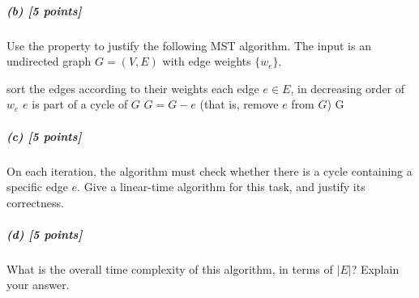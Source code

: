 \documentclass[11pt]{article}
\begin{document}


\subparagraph{(b) [5 points]}
Use the property to justify the following MST algorithm. The input is an undirected graph
$G = (V, E)$ with edge weights $\{ w_e \}$.

\begin{codebox}
\li sort the edges according to their weights
\li \For each edge $e \in E$, in decreasing order of $w_e$
    \Then
    \li \If $e$ is part of a cycle of $G$
        \Then
        \li $G = G - e$ (that is, remove $e$ from $G$)
        \End
    \End
\li \Return G
\end{codebox}



\subparagraph{(c) [5 points]}
On each iteration, the algorithm must check whether there is a cycle containing a specific edge $e$.
Give a linear-time algorithm for this task, and justify its correctness.



\subparagraph{(d) [5 points]}
What is the overall time complexity of this algorithm, in terms of $|E|$? Explain your answer.


\end{document}
